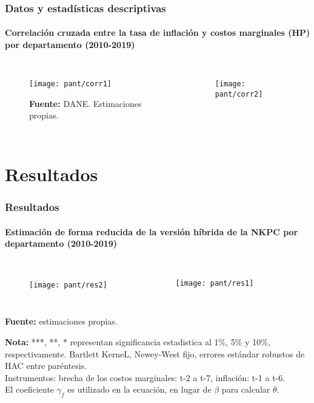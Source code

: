 \documentclass[10pt]{beamer}
\begin{document}
\begin{frame}
\frametitle{Datos y estadísticas descriptivas}
\framesubtitle{Correlación cruzada entre la tasa de inflación y costos marginales (HP) por departamento (2010-2019)}
\begin{columns}[c]
\begin{figure}
\texttt{[image: pant/corr1]}
\centering
\label{fig:ejemplo}\\
  \raggedright  \tiny \textbf{Fuente:} DANE. Estimaciones propias.
\end{figure} 
				 \vspace*{-0.8cm}
\begin{figure}
\texttt{[image: pant/corr2]}
\centering
\label{fig:ejemplo}%
\end{figure} 
\end{columns}
\end{frame}

 
\section{Resultados}
\begin{frame}
\frametitle{Resultados}
\framesubtitle{Estimación de forma reducida de la versión híbrida de la NKPC por departamento (2010-2019)}
\begin{columns}[c]
\begin{figure}
\texttt{[image: pant/res2]}
\centering
\label{fig:ejemplo}\
  \raggedright  
\end{figure} 
				 \vspace*{-0.6cm}
\begin{figure}
\texttt{[image: pant/res1]}
\centering
\label{fig:ejemplo}%
\end{figure} 
\end{columns}
\tiny \textbf{Fuente:} estimaciones propias.\\
\raggedright \tiny \textbf{Nota:} ***,  **, * representan significancia estadistica al 1\%, 5\% y 10\%, respectivamente. Bartlett KerneL, Newey-West fijo, errores estándar robustos de HAC entre paréntesis.\\
Instrumentos: brecha de los costos marginales: t-2 a t-7, inflación: t-1 a t-6.\\
El coeficiente $\gamma_{f}$ es utilizado en la ecuación, en lugar de $\beta$ para calcular $\theta$. 
\end{frame}
\end{document}
